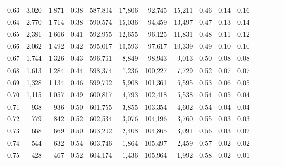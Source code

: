 \begin{tabular}{rrrcrrrrrrrrrrr}
0.63 &   3,020 &  1,871 &                                       0.38 &  587,804 &   17,806 &   92,745 &   15,211 &  0.46 &  0.14 &                         0.16 \\
0.64 &   2,770 &  1,714 &                                       0.38 &  590,574 &   15,036 &   94,459 &   13,497 &  0.47 &  0.13 &                         0.14 \\
0.65 &   2,381 &  1,666 &                                       0.41 &  592,955 &   12,655 &   96,125 &   11,831 &  0.48 &  0.11 &                         0.12 \\
0.66 &   2,062 &  1,492 &                                       0.42 &  595,017 &   10,593 &   97,617 &   10,339 &  0.49 &  0.10 &                         0.10 \\
0.67 &   1,744 &  1,326 &                                       0.43 &  596,761 &    8,849 &   98,943 &    9,013 &  0.50 &  0.08 &                         0.08 \\
0.68 &   1,613 &  1,284 &                                       0.44 &  598,374 &    7,236 &  100,227 &    7,729 &  0.52 &  0.07 &                         0.07 \\
0.69 &   1,328 &  1,134 &                                       0.46 &  599,702 &    5,908 &  101,361 &    6,595 &  0.53 &  0.06 &                         0.05 \\
0.70 &   1,115 &  1,057 &                                       0.49 &  600,817 &    4,793 &  102,418 &    5,538 &  0.54 &  0.05 &                         0.04 \\
0.71 &     938 &    936 &                                       0.50 &  601,755 &    3,855 &  103,354 &    4,602 &  0.54 &  0.04 &                         0.04 \\
0.72 &     779 &    842 &                                       0.52 &  602,534 &    3,076 &  104,196 &    3,760 &  0.55 &  0.03 &                         0.03 \\
0.73 &     668 &    669 &                                       0.50 &  603,202 &    2,408 &  104,865 &    3,091 &  0.56 &  0.03 &                         0.02 \\
0.74 &     544 &    632 &                                       0.54 &  603,746 &    1,864 &  105,497 &    2,459 &  0.57 &  0.02 &                         0.02 \\
0.75 &     428 &    467 &                                       0.52 &  604,174 &    1,436 &  105,964 &    1,992 &  0.58 &  0.02 &                         0.01 \\

\end{tabular}
